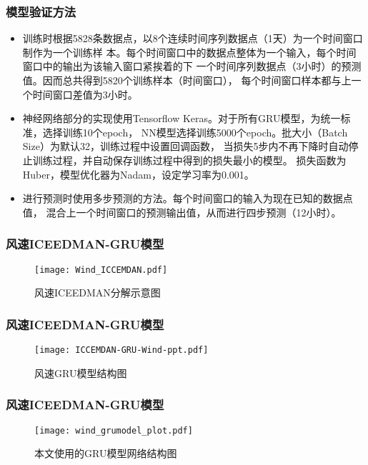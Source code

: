 \documentclass[14pt, AutoFakeBold]{ppt}
\begin{document}
\begin{frame}
  \frametitle{模型验证方法}
  \begin{itemize}
    \item 训练时根据5828条数据点，以8个连续时间序列数据点（1天）为一个时间窗口制作为一个训练样
  本。每个时间窗口中的数据点整体为一个输入，每个时间窗口中的输出为该输入窗口紧挨着的下
  一个时间序列数据点（3小时）的预测值。因而总共得到5820个训练样本（时间窗口），
  每个时间窗口样本都与上一个时间窗口差值为3小时。

    \item 神经网络部分的实现使用Tensorflow Keras。对于所有GRU模型，为统一标准，选择训练10个epoch，
  NN模型选择训练5000个epoch。批大小（Batch Size）为默认32，训练过程中设置回调函数，
  当损失5步内不再下降时自动停止训练过程，并自动保存训练过程中得到的损失最小的模型。
  损失函数为Huber，模型优化器为Nadam，设定学习率为0.001。

    \item 进行预测时使用多步预测的方法。每个时间窗口的输入为现在已知的数据点值，
  混合上一个时间窗口的预测输出值，从而进行四步预测（12小时）。
  \end{itemize}
\end{frame}

\begin{frame}
  \frametitle{风速ICEEDMAN-GRU模型}
  \begin{figure}[H]
    \centering
      \texttt{[image: Wind\_ICCEMDAN.pdf]}
      \caption{风速ICEEDMAN分解示意图}
      \label{fig_Wind_ICCEMDAN}
  \end{figure}
\end{frame}

\begin{frame}
  \frametitle{风速ICEEDMAN-GRU模型}
  \begin{figure}[H]
    \centering
      \texttt{[image: ICCEMDAN-GRU-Wind-ppt.pdf]}
      \caption{风速GRU模型结构图}
      \label{fig_ICCEMDAN_GRU_Wind}
  \end{figure}
\end{frame}

\begin{frame}
  \frametitle{风速ICEEDMAN-GRU模型}
  \begin{figure}[H]
    \centering
      \texttt{[image: wind\_grumodel\_plot.pdf]}
      \caption{本文使用的GRU模型网络结构图}
      \label{fig_gru}
  \end{figure}
\end{frame}
\end{document}
